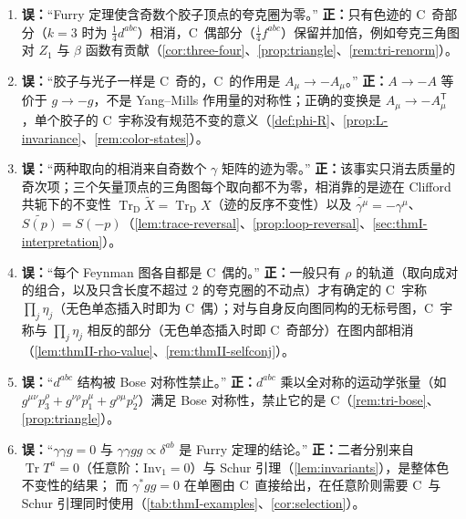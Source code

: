 \documentclass[UTF8,a4paper,11pt,fontset=fandol]{ctexart}
\theoremstyle{cplain}
\theoremstyle{cdefinition}
\theoremstyle{cremark}
\numberwithin{equation}{section}
\DeclareMathOperator{\Tr}{Tr}
\newcommand{\TrD}{\operatorname{Tr}_{\mathrm{D}}}   %
\newcommand{\tp}{\mathsf{T}}                         %
\newcommand{\ii}{\mathrm{i}}                        %
\newcommand{\Cconj}[1]{\widetilde{#1}}              %
\begin{document}
\begin{tcolorbox}[enhanced,breakable,title=常见误解及其更正,fonttitle=\bfseries,
  colback=red!2!white,colframe=red!45!black,boxrule=0.7pt,arc=2pt,
  left=6pt,right=6pt,top=4pt,bottom=4pt,before skip=8pt,after skip=8pt]
\begin{enumerate}[label=\textbf{\arabic*.},leftmargin=1.8em,itemsep=2pt,topsep=1pt]
\item \textbf{误：}“Furry 定理使含奇数个胶子顶点的夸克圈为零。”\enspace
\textbf{正：}只有色迹的 C~奇部分（$k=3$ 时为 $\frac14d^{abc}$）相消，C~偶部分（$\frac{\ii}{4}f^{abc}$）保留并加倍，例如夸克三角图对 $Z_1$ 与 $\beta$ 函数有贡献（\cref{cor:three-four}、\cref{prop:triangle}、\cref{rem:tri-renorm}）。
\item \textbf{误：}“胶子与光子一样是 C~奇的，C~的作用是 $A_\mu\to-A_\mu$。”\enspace
\textbf{正：}$A\to-A$ 等价于 $g\to-g$，不是 Yang--Mills 作用量的对称性；正确的变换是 $A_\mu\to-A_\mu^{\tp}$，单个胶子的 C~宇称没有规范不变的意义（\cref{def:phi-R}、\cref{prop:L-invariance}、\cref{rem:color-states}）。
\item \textbf{误：}“两种取向的相消来自奇数个 $\gamma$ 矩阵的迹为零。”\enspace
\textbf{正：}该事实只消去质量的奇次项；三个矢量顶点的三角图每个取向都不为零，相消靠的是迹在 Clifford 共轭下的不变性 $\TrD\Cconj X=\TrD X$（迹的反序不变性）以及 $\Cconj{\gamma^\mu}=-\gamma^\mu$、$\Cconj{S(p)}=S(-p)$（\cref{lem:trace-reversal}、\cref{prop:loop-reversal}、\cref{sec:thmI-interpretation}）。
\item \textbf{误：}“每个 Feynman 图各自都是 C~偶的。”\enspace
\textbf{正：}一般只有 $\rho$ 的轨道（取向成对的组合，以及只含长度不超过 $2$ 的夸克圈的不动点）才有确定的 C~宇称 $\prod_j\eta_j$（无色单态插入时即为 C~偶）；对与自身反向图同构的无标号图，C~宇称与 $\prod_j\eta_j$ 相反的部分（无色单态插入时即 C~奇部分）在图内部相消（\cref{lem:thmII-rho-value}、\cref{rem:thmII-selfconj}）。
\item \textbf{误：}“$d^{abc}$ 结构被 Bose 对称性禁止。”\enspace
\textbf{正：}$d^{abc}$ 乘以全对称的运动学张量（如 $g^{\mu\nu}p_3^\rho+g^{\nu\rho}p_1^\mu+g^{\rho\mu}p_2^\nu$）满足 Bose 对称性，禁止它的是 C（\cref{rem:tri-bose}、\cref{prop:triangle}）。
\item \textbf{误：}“$\gamma\gamma g=0$ 与 $\gamma\gamma gg\propto\delta^{ab}$ 是 Furry 定理的结论。”\enspace
\textbf{正：}二者分别来自 $\Tr T^a=0$（任意阶：$\mathrm{Inv}_1=0$）与 Schur 引理（\cref{lem:invariants}），是整体色不变性的结果；
而 $\gamma^*gg=0$ 在单圈由 C~直接给出，在任意阶则需要 C~与 Schur 引理同时使用（\cref{tab:thmI-examples}、\cref{cor:selection}）。

\end{enumerate}
\end{tcolorbox}
\end{document}
